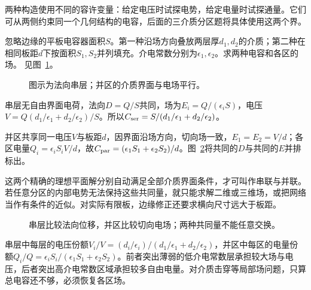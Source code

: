 两种构造使用不同的容许变量：给定电压时试探电势，给定电量时试探通量。它们可从两侧约束同一个几何结构的电容，后面的三介质分区题将具体使用这两个界。

\begin{example}[串层与并区平板电容]\label{ex:es4-e6}
忽略边缘的平板电容器面积$S$。第一种沿场方向叠放两层厚$d_1,d_2$的介质；第二种在相同板距$d$下按面积$S_1,S_2$并列填充。介电常数分别为$\epsilon_1,\epsilon_2$。求两种电容和各区的场。 见图~\ref{fig:es4-e6-q}。
\end{example}

\begin{figure}[H]\centering
{}
\caption{图示为法向串层；并区的介质界面与电场平行。}\label{fig:es4-e6-q}
\end{figure}
\begin{solution}
串层无自由界面电荷，法向$D=Q/S$共同，场为$E_i=Q/(\epsilon_iS)$，电压$V=Q(d_1/\epsilon_1+d_2/\epsilon_2)/S$。所以$C_{\rm ser}=S/(d_1/\epsilon_1+d_2/\epsilon_2)$。

并区共享同一电压$V$与板距$d$，因界面沿场方向，切向场一致，$E_1=E_2=V/d$；各区电量$Q_i=\epsilon_iS_iV/d$，故$C_{\rm par}=(\epsilon_1S_1+\epsilon_2S_2)/d$。图~\ref{fig:es4-e6-s}将共同的$D$与共同的$E$并排标出。

这两个精确的理想平面解分别自动满足全部介质界面条件，才可叫作串联与并联。若任意分区的内部电势无法保持这些共同量，就只能求解二维或三维场，或把网络当作有条件的近似。对实际有限板，边缘修正还要求横向尺寸远大于板距。
\begin{figure}[H]\centering
{}
\caption{串层比较法向位移，并区比较切向电场；两种共同量不能任意交换。}\label{fig:es4-e6-s}
\end{figure}


串层中每层的电压份额$V_i/V=(d_i/\epsilon_i)/(d_1/\epsilon_1+d_2/\epsilon_2)$，并区中每区的电量份额$Q_i/Q=\epsilon_iS_i/(\epsilon_1S_1+\epsilon_2S_2)$。前者突出薄弱的低介电常数层承担较大场与电压，后者突出高介电常数区域承担较多自由电量。对介质击穿等局部场问题，只算总电容还不够，必须恢复各区场。
\end{solution}

